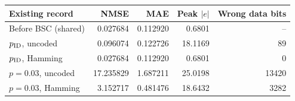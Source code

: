 \begin{tabular}{lrrrr}
\toprule
Existing record & NMSE & MAE & Peak $|e|$ & Wrong data bits \\
\midrule
Before BSC (shared) & 0.027684 & 0.112920 & 0.6801 & -- \\
$p_{\rm ID}$, uncoded & 0.096074 & 0.122726 & 18.1169 & 89 \\
$p_{\rm ID}$, Hamming & 0.027684 & 0.112920 & 0.6801 & 0 \\
$p=0.03$, uncoded & 17.235829 & 1.687211 & 25.0198 & 13420 \\
$p=0.03$, Hamming & 3.152717 & 0.481476 & 18.6432 & 3282 \\
\bottomrule
\end{tabular}
